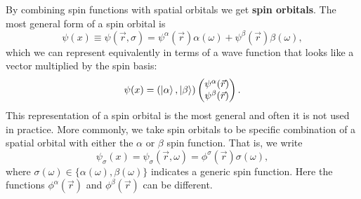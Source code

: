 \documentclass[../Main/chem532-notes.tex]{subfiles}
\begin{document}
By combining spin functions with spatial orbitals we get \textbf{spin orbitals}. The most general form of a spin orbital is
\begin{equation}
\psi (x) \equiv \psi(\vec{r},\sigma) = \psi^{\alpha}(\vec{r}) \alpha(\omega) + \psi^{\beta}(\vec{r}) \beta(\omega),
\end{equation}
which we can represent equivalently in terms of a wave function that looks like a vector multiplied by the spin basis:
\begin{equation}
\psi (x) = (\ket{\alpha}, \ket{\beta})
\begin{pmatrix}
\psi^{\alpha}(\vec{r})  \\
  \psi^{\beta}(\vec{r})
\end{pmatrix}.
\end{equation}
This representation of a spin orbital is the most general and often it is not used in practice. 
More commonly, we take spin orbitals to be specific combination of a spatial orbital with either the $\alpha$ or $\beta$ spin function.
That is, we write
\begin{equation}
\psi_{\sigma} (x) = \psi_{\sigma} (\vec{r},\omega) = \phi^\sigma(\vec{r}) \sigma(\omega),
\end{equation}
where $\sigma(\omega) \in \{\alpha(\omega),\beta(\omega)\}$ indicates a generic spin function.
Here the functions $\phi^\alpha(\vec{r})$ and $\phi^\beta(\vec{r})$ can be different.
\end{document}
